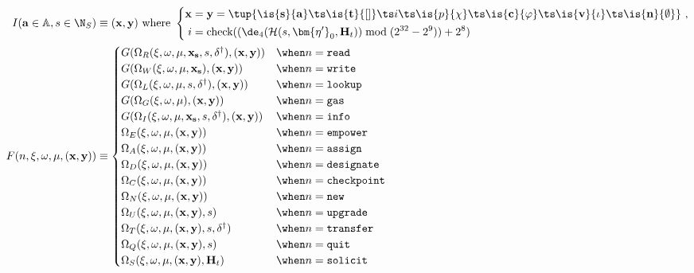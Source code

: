 \begin{align}
  I(\mathbf{a} \in \mathbb{A}, s \in \N_S) &\equiv (\mathbf{x}, \mathbf{y}) \text{ where }
  \left\{ \begin{aligned}
    \mathbf{x} &= \mathbf{y} = \tup{\is{\mathbf{s}}{\mathbf{a}}\ts\is{\mathbf{t}}{[]}\ts i\ts\is{p}{\chi}\ts\is{\mathbf{c}}{\varphi}\ts\is{\mathbf{v}}{\iota}\ts\is{\mathbf{n}}{\emptyset}}\ ,\\
    i &= \text{check}((\de_4(\mathcal{H}(s, \bm{\eta'}_0, \mathbf{H}_t)) \bmod (2^{32}-2^9)) + 2^8)
  \end{aligned} \right. \\
  F(n, \xi, \omega, \mu, (\mathbf{x}, \mathbf{y})) &\equiv \begin{cases}
    G(\Omega_R(\xi, \omega, \mu, \mathbf{x}_\mathbf{s}, s, \delta^\dagger), (\mathbf{x}, \mathbf{y})) &\when n = \mathtt{read} \\
    G(\Omega_W(\xi, \omega, \mu, \mathbf{x}_\mathbf{s}), (\mathbf{x}, \mathbf{y})) &\when n = \mathtt{write} \\
    G(\Omega_L(\xi, \omega, \mu, s, \delta^\dagger), (\mathbf{x}, \mathbf{y})) &\when n = \mathtt{lookup} \\
    G(\Omega_G(\xi, \omega, \mu), (\mathbf{x}, \mathbf{y})) &\when n = \mathtt{gas} \\
    G(\Omega_I(\xi, \omega, \mu, \mathbf{x}_\mathbf{s}, s, \delta^\dagger), (\mathbf{x}, \mathbf{y})) &\when n = \mathtt{info} \\
    \Omega_E(\xi, \omega, \mu, (\mathbf{x}, \mathbf{y})) &\when n = \mathtt{empower}\\
    \Omega_A(\xi, \omega, \mu, (\mathbf{x}, \mathbf{y})) &\when n = \mathtt{assign}\\
    \Omega_D(\xi, \omega, \mu, (\mathbf{x}, \mathbf{y})) &\when n = \mathtt{designate}\\
    \Omega_C(\xi, \omega, \mu, (\mathbf{x}, \mathbf{y})) &\when n = \mathtt{checkpoint} \\
    \Omega_N(\xi, \omega, \mu, (\mathbf{x}, \mathbf{y})) &\when n = \mathtt{new} \\
    \Omega_U(\xi, \omega, \mu, (\mathbf{x}, \mathbf{y}), s) &\when n = \mathtt{upgrade} \\
    \Omega_T(\xi, \omega, \mu, (\mathbf{x}, \mathbf{y}), s, \delta^\dagger) &\when n = \mathtt{transfer} \\
    \Omega_Q(\xi, \omega, \mu, (\mathbf{x}, \mathbf{y}), s) &\when n = \mathtt{quit} \\
    \Omega_S(\xi, \omega, \mu, (\mathbf{x}, \mathbf{y}), \mathbf{H}_t) &\when n = \mathtt{solicit} \\

\end{cases}
\end{align}
